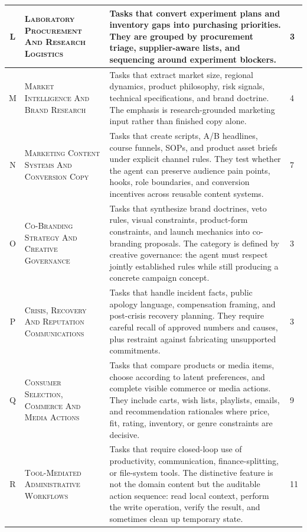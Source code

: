 \documentclass{llmxive}
\begin{document}
{\begin{longtable}{cp{}p{}p{}}
L &
\textsc{Laboratory Procurement And Research Logistics} &
Tasks that convert experiment plans and inventory gaps into purchasing priorities. They are grouped by procurement triage, supplier-aware lists, and sequencing around experiment blockers. &
3 \\
\midrule[0.75pt]

M &
\textsc{Market Intelligence And Brand Research} &
Tasks that extract market size, regional dynamics, product philosophy, risk signals, technical specifications, and brand doctrine. The emphasis is research-grounded marketing input rather than finished copy alone. &
4 \\
\midrule[0.75pt]

N &
\textsc{Marketing Content Systems And Conversion Copy} &
Tasks that create scripts, A/B headlines, course funnels, SOPs, and product asset briefs under explicit channel rules. They test whether the agent can preserve audience pain points, hooks, role boundaries, and conversion incentives across reusable content systems. &
7 \\
\midrule[0.75pt]

O &
\textsc{Co-Branding Strategy And Creative Governance} &
Tasks that synthesize brand doctrines, veto rules, visual constraints, product-form constraints, and launch mechanics into co-branding proposals. The category is defined by creative governance: the agent must respect jointly established rules while still producing a concrete campaign concept. &
3 \\
\midrule[0.75pt]

P &
\textsc{Crisis, Recovery And Reputation Communications} &
Tasks that handle incident facts, public apology language, compensation framing, and post-crisis recovery planning. They require careful recall of approved numbers and causes, plus restraint against fabricating unsupported commitments. &
3 \\
\midrule[0.75pt]

Q &
\textsc{Consumer Selection, Commerce And Media Actions} &
Tasks that compare products or media items, choose according to latent preferences, and complete visible commerce or media actions. They include carts, wish lists, playlists, emails, and recommendation rationales where price, fit, rating, inventory, or genre constraints are decisive. &
9 \\
\midrule[0.75pt]

R &
\textsc{Tool-Mediated Administrative Workflows} &
Tasks that require closed-loop use of productivity, communication, finance-splitting, or file-system tools. The distinctive feature is not the domain content but the auditable action sequence: read local context, perform the write operation, verify the result, and sometimes clean up temporary state. &
11 \\
\end{longtable}
}
\end{document}
